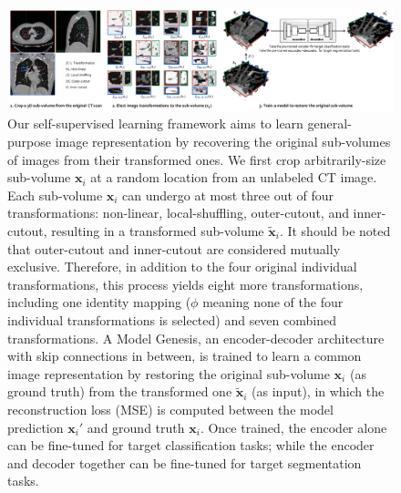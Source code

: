 \begin{figure}
\begin{center}
\includegraphics[width=1.0\linewidth]{Figures/CH5/fig_genesis_method.pdf}
\end{center}
\caption[Models Genesis Learn Generic Features by Image Restoration]{
Our self-supervised learning framework aims to learn general-purpose image representation by recovering the original sub-volumes of images from their transformed ones. We first crop arbitrarily-size sub-volume $\textbf{x}_i$ at a random location from an unlabeled CT image. Each sub-volume $\textbf{x}_i$ can undergo at most three out of four transformations: non-linear, local-shuffling, outer-cutout, and inner-cutout, resulting in a transformed sub-volume $\tilde{\textbf{x}}_i$. It should be noted that outer-cutout and inner-cutout are considered mutually exclusive. Therefore, in addition to the four original individual transformations, this process yields eight more transformations, including one identity mapping ($\phi$ meaning none of the four individual transformations is selected) and seven combined transformations. A Model Genesis, an encoder-decoder architecture with skip connections in between, is trained to learn a common image representation by restoring the original sub-volume $\textbf{x}_i$ (as ground truth) from the transformed one $\tilde{\textbf{x}}_i$ (as input), in which the reconstruction loss (MSE) is computed between the model prediction $\textbf{x}_i'$ and ground truth $\textbf{x}_i$. Once trained, the encoder alone can be fine-tuned for target classification tasks; while the encoder and decoder together can be fine-tuned for target segmentation tasks. 
}
\label{ch5:fig:self_supervised_learning_framework}
\end{figure}





